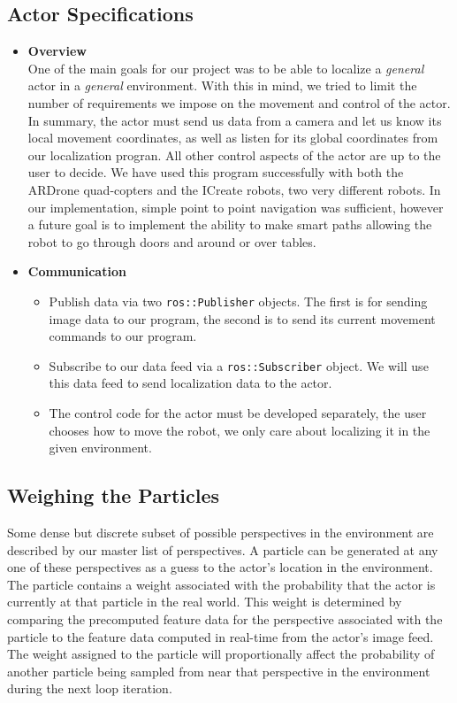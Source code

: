 \documentclass[a4paper,11pt]{article}
\begin{document}
 \subsection{Actor Specifications}
\begin{itemize}
\item \textbf{Overview} \\
One of the main goals for our project was to be able to localize a \emph{general} actor in a \emph{general} environment. With this in mind, we tried to limit the number of requirements we impose on the movement and control of the actor. In summary, the actor must send us data from a camera and let us know its local movement coordinates, as well as listen for its global coordinates from our localization progran. All other control aspects of the actor are up to the user to decide. We have used this program successfully with both the ARDrone quad-copters and the ICreate robots, two very different robots. In our implementation, simple point to point navigation was sufficient, however a future goal is to implement the ability to make smart paths allowing the robot to go through doors and around or over tables.

\item \textbf{Communication} \\
  \begin{itemize}
  \item Publish data via two \texttt{ros::Publisher} objects. The first is for sending image data to our program, the second is to send its current movement commands to our program. 
  \item Subscribe to our data feed via a \texttt{ros::Subscriber} object. We will use this data feed to send localization data to the actor.
  \item The control code for the actor must be developed separately, the user chooses how to move the robot, we only care about localizing it in the given environment.
  \end{itemize} 
\end{itemize}

\subsection{Weighing the Particles}
Some dense but discrete subset of possible perspectives in the environment are described by our master list of perspectives. A particle can be generated at any one of these perspectives as a guess to the actor's location in the environment. The particle contains a weight associated with the probability that the actor is currently at that particle in the real world. This weight is determined by comparing the precomputed feature data for the perspective associated with the particle to the feature data computed in real-time from the actor's image feed. The weight assigned to the particle will proportionally affect the probability of another particle being sampled from near that perspective in the environment during the next loop iteration.
\end{document}
